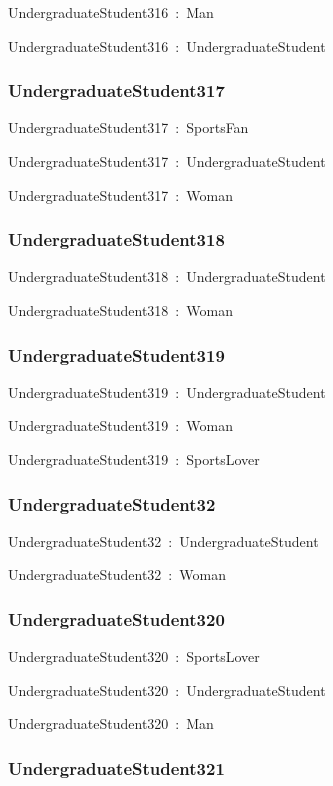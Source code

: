 \documentclass{article}
\begin{document}
UndergraduateStudent316~:~Man

UndergraduateStudent316~:~UndergraduateStudent

\subsubsection*{UndergraduateStudent317}

UndergraduateStudent317~:~SportsFan

UndergraduateStudent317~:~UndergraduateStudent

UndergraduateStudent317~:~Woman

\subsubsection*{UndergraduateStudent318}

UndergraduateStudent318~:~UndergraduateStudent

UndergraduateStudent318~:~Woman

\subsubsection*{UndergraduateStudent319}

UndergraduateStudent319~:~UndergraduateStudent

UndergraduateStudent319~:~Woman

UndergraduateStudent319~:~SportsLover

\subsubsection*{UndergraduateStudent32}

UndergraduateStudent32~:~UndergraduateStudent

UndergraduateStudent32~:~Woman

\subsubsection*{UndergraduateStudent320}

UndergraduateStudent320~:~SportsLover

UndergraduateStudent320~:~UndergraduateStudent

UndergraduateStudent320~:~Man

\subsubsection*{UndergraduateStudent321}
\end{document}
